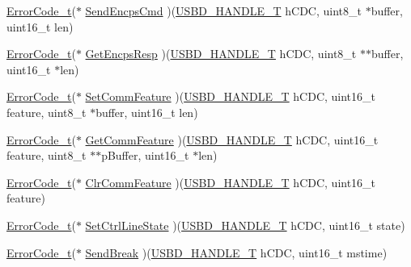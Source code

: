 \begin{DoxyCompactItemize}
\item 
\hyperlink{error_8h_a905255056c349318139d94aa4523d516}{Error\-Code\-\_\-t}($\ast$ \hyperlink{structUSBD__CDC__INIT__PARAM_a1416c991ffee64d22e7bf331adfa3df6}{Send\-Encps\-Cmd} )(\hyperlink{group__USBD__Core_gafdbb2204d929cb9d75736bd2b42342ac}{U\-S\-B\-D\-\_\-\-H\-A\-N\-D\-L\-E\-\_\-\-T} h\-C\-D\-C, uint8\-\_\-t $\ast$buffer, uint16\-\_\-t len)
\item 
\hyperlink{error_8h_a905255056c349318139d94aa4523d516}{Error\-Code\-\_\-t}($\ast$ \hyperlink{structUSBD__CDC__INIT__PARAM_ac07ac0b3f79716ab2aee787662920eb7}{Get\-Encps\-Resp} )(\hyperlink{group__USBD__Core_gafdbb2204d929cb9d75736bd2b42342ac}{U\-S\-B\-D\-\_\-\-H\-A\-N\-D\-L\-E\-\_\-\-T} h\-C\-D\-C, uint8\-\_\-t $\ast$$\ast$buffer, uint16\-\_\-t $\ast$len)
\item 
\hyperlink{error_8h_a905255056c349318139d94aa4523d516}{Error\-Code\-\_\-t}($\ast$ \hyperlink{structUSBD__CDC__INIT__PARAM_a0ee84efcc8e1dc9e0a5ff2e93e9e20a7}{Set\-Comm\-Feature} )(\hyperlink{group__USBD__Core_gafdbb2204d929cb9d75736bd2b42342ac}{U\-S\-B\-D\-\_\-\-H\-A\-N\-D\-L\-E\-\_\-\-T} h\-C\-D\-C, uint16\-\_\-t feature, uint8\-\_\-t $\ast$buffer, uint16\-\_\-t len)
\item 
\hyperlink{error_8h_a905255056c349318139d94aa4523d516}{Error\-Code\-\_\-t}($\ast$ \hyperlink{structUSBD__CDC__INIT__PARAM_ae5624dcf9323eb9fa53950ad7b66ea78}{Get\-Comm\-Feature} )(\hyperlink{group__USBD__Core_gafdbb2204d929cb9d75736bd2b42342ac}{U\-S\-B\-D\-\_\-\-H\-A\-N\-D\-L\-E\-\_\-\-T} h\-C\-D\-C, uint16\-\_\-t feature, uint8\-\_\-t $\ast$$\ast$p\-Buffer, uint16\-\_\-t $\ast$len)
\item 
\hyperlink{error_8h_a905255056c349318139d94aa4523d516}{Error\-Code\-\_\-t}($\ast$ \hyperlink{structUSBD__CDC__INIT__PARAM_ab431f8eb60bcbf56315697c8c6f35093}{Clr\-Comm\-Feature} )(\hyperlink{group__USBD__Core_gafdbb2204d929cb9d75736bd2b42342ac}{U\-S\-B\-D\-\_\-\-H\-A\-N\-D\-L\-E\-\_\-\-T} h\-C\-D\-C, uint16\-\_\-t feature)
\item 
\hyperlink{error_8h_a905255056c349318139d94aa4523d516}{Error\-Code\-\_\-t}($\ast$ \hyperlink{structUSBD__CDC__INIT__PARAM_ad197147b58fb921e1f1e43200c7c85dd}{Set\-Ctrl\-Line\-State} )(\hyperlink{group__USBD__Core_gafdbb2204d929cb9d75736bd2b42342ac}{U\-S\-B\-D\-\_\-\-H\-A\-N\-D\-L\-E\-\_\-\-T} h\-C\-D\-C, uint16\-\_\-t state)
\item 
\hyperlink{error_8h_a905255056c349318139d94aa4523d516}{Error\-Code\-\_\-t}($\ast$ \hyperlink{structUSBD__CDC__INIT__PARAM_afb9fd4ee94816c62807f0e67375be6f9}{Send\-Break} )(\hyperlink{group__USBD__Core_gafdbb2204d929cb9d75736bd2b42342ac}{U\-S\-B\-D\-\_\-\-H\-A\-N\-D\-L\-E\-\_\-\-T} h\-C\-D\-C, uint16\-\_\-t mstime)

\end{DoxyCompactItemize}
